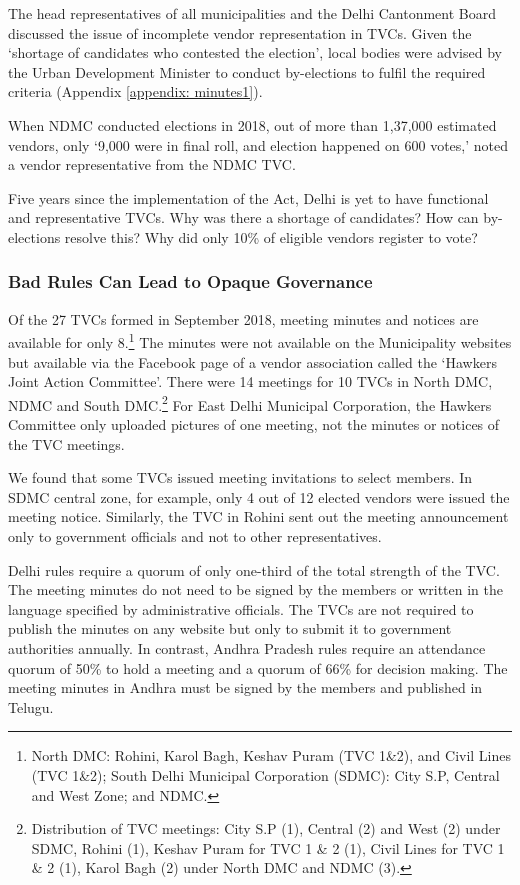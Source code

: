 \documentclass[a4paper, 12pt, twoside, table]{article}
\begin{document}
{{The head representatives of all municipalities and the Delhi Cantonment Board discussed the issue of incomplete vendor representation in TVCs. Given the `shortage of candidates who contested the election', local bodies were advised by the Urban Development Minister to conduct by-elections to fulfil the required criteria (Appendix \ref{appendix: minutes1}).  

When NDMC conducted elections in 2018, out of more than 1,37,000 estimated vendors, only `9,000 were in final roll, and election happened on 600 votes,' noted a vendor representative from the NDMC TVC. 

Five years since the implementation of the Act, Delhi is yet to have functional and representative TVCs. Why was there a shortage of candidates? How can by-elections resolve this? Why did only 10\% of eligible vendors register to vote? 

\subsubsection*{Bad Rules Can Lead to Opaque Governance}

Of the 27 TVCs formed in September 2018, meeting minutes and notices are available for only 8.\footnote{ North DMC: Rohini, Karol Bagh, Keshav Puram (TVC 1\&2), and Civil Lines (TVC 1\&2); South Delhi Municipal Corporation (SDMC): City S.P, Central and West Zone; and NDMC.
} The minutes were not available on the Municipality websites but available via the Facebook page of a vendor association called the `Hawkers Joint Action Committee'. There were 14 meetings for 10 TVCs in North DMC, NDMC and South DMC.\footnote{ Distribution of TVC meetings: City S.P (1), Central (2) and West (2) under SDMC, Rohini (1), Keshav Puram for TVC 1 \& 2 (1), Civil Lines for TVC 1 \& 2 (1), Karol Bagh (2) under North DMC and NDMC (3).
} For East Delhi Municipal Corporation, the Hawkers Committee only uploaded pictures of one meeting, not the minutes or notices of the TVC meetings. 

We found that some TVCs issued meeting invitations to select members. In SDMC central zone, for example, only 4 out of 12 elected vendors were issued the meeting notice. Similarly, the TVC in Rohini sent out the meeting announcement only to government officials and not to other representatives. 

Delhi rules require a quorum of only one-third of the total strength of the TVC. The meeting minutes do not need to be signed by the members or written in the language specified by administrative officials. The TVCs are not required to publish the minutes on any website but only to submit it to government authorities annually. In contrast, Andhra Pradesh rules require an attendance quorum of 50\% to hold a meeting and a quorum of 66\% for decision making. The meeting minutes in Andhra must be signed by the members and published in Telugu.

}}
\end{document}
